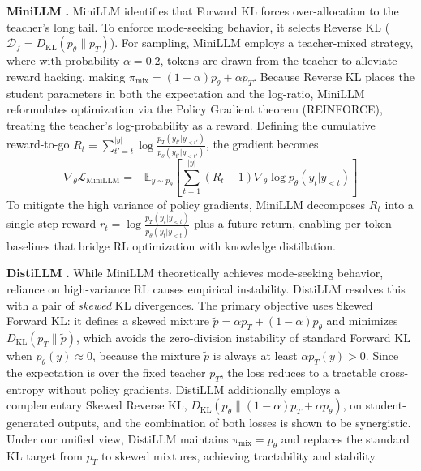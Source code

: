 \documentclass{article} %
\newcommand{\KL}{D_{\mathrm{KL}}}
\newcommand{\ptheta}{p_\theta}
\newcommand{\pteacher}{p_T}
\begin{document}
\textbf{MiniLLM} \citep{2306.08543}\textbf{.} MiniLLM identifies that Forward KL forces over-allocation to the teacher's long tail. To enforce mode-seeking behavior, it selects Reverse KL ($\mathcal{D}_f = \KL(\ptheta \parallel \pteacher)$). For sampling, MiniLLM employs a teacher-mixed strategy, where with probability $\alpha = 0.2$, tokens are drawn from the teacher to alleviate reward hacking, making $\pi_{\mathrm{mix}} = (1 - \alpha)\ptheta + \alpha \pteacher$. Because Reverse KL places the student parameters in both the expectation and the log-ratio, MiniLLM reformulates optimization via the Policy Gradient theorem (REINFORCE), treating the teacher's log-probability as a reward. Defining the cumulative reward-to-go $R_t = \sum_{t'=t}^{|y|} \log \frac{\pteacher(y_{t'}|y_{<t'})}{\ptheta(y_{t'}|y_{<t'})}$, the gradient becomes
\begin{equation}
    \nabla_\theta \mathcal{L}_{\mathrm{MiniLLM}} = -\mathbb{E}_{y \sim \ptheta} \left[ \sum_{t=1}^{|y|} \left( R_t - 1 \right) \nabla_\theta \log \ptheta(y_t|y_{<t}) \right]
\end{equation}
To mitigate the high variance of policy gradients, MiniLLM decomposes $R_t$ into a single-step reward $r_t = \log \frac{\pteacher(y_t|y_{<t})}{\ptheta(y_t|y_{<t})}$ plus a future return, enabling per-token baselines that bridge RL optimization with knowledge distillation.

\textbf{DistiLLM} \citep{2402.03898}\textbf{.} While MiniLLM theoretically achieves mode-seeking behavior, reliance on high-variance RL causes empirical instability. DistiLLM resolves this with a pair of \emph{skewed} KL divergences. The primary objective uses Skewed Forward KL: it defines a skewed mixture $\tilde{p} = \alpha \pteacher + (1-\alpha) \ptheta$ and minimizes $\KL(\pteacher \parallel \tilde{p})$, which avoids the zero-division instability of standard Forward KL when $\ptheta(y) \approx 0$, because the mixture $\tilde{p}$ is always at least $\alpha \pteacher(y) > 0$. Since the expectation is over the fixed teacher $\pteacher$, the loss reduces to a tractable cross-entropy without policy gradients. DistiLLM additionally employs a complementary Skewed Reverse KL, $\KL(\ptheta \parallel (1-\alpha)\pteacher + \alpha\ptheta)$, on student-generated outputs, and the combination of both losses is shown to be synergistic. Under our unified view, DistiLLM maintains $\pi_{\mathrm{mix}} = \ptheta$ and replaces the standard KL target from $\pteacher$ to skewed mixtures, achieving tractability and stability.
\end{document}
